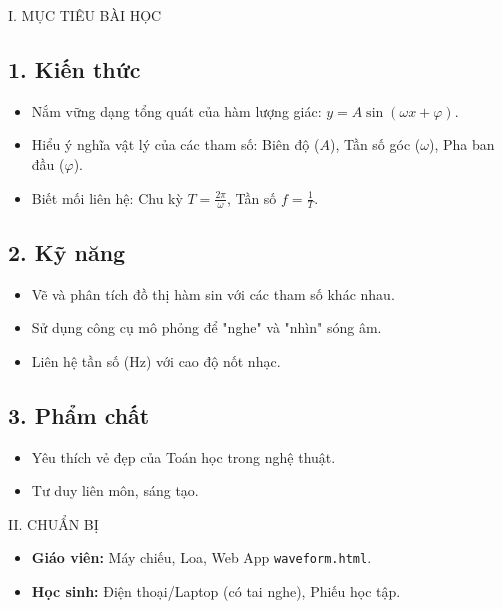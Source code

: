 \documentclass[12pt,a4paper]{article}
\begin{document}
\begin{sectionbox}{I. MỤC TIÊU BÀI HỌC}
\subsection*{1. Kiến thức}
\begin{itemize}
    \item Nắm vững dạng tổng quát của hàm lượng giác: $y = A\sin(\omega x + \varphi)$.
    \item Hiểu ý nghĩa vật lý của các tham số: Biên độ ($A$), Tần số góc ($\omega$), Pha ban đầu ($\varphi$).
    \item Biết mối liên hệ: Chu kỳ $T = \frac{2\pi}{\omega}$, Tần số $f = \frac{1}{T}$.
\end{itemize}

\subsection*{2. Kỹ năng}
\begin{itemize}
    \item Vẽ và phân tích đồ thị hàm sin với các tham số khác nhau.
    \item Sử dụng công cụ mô phỏng để "nghe" và "nhìn" sóng âm.
    \item Liên hệ tần số (Hz) với cao độ nốt nhạc.
\end{itemize}

\subsection*{3. Phẩm chất}
\begin{itemize}
    \item Yêu thích vẻ đẹp của Toán học trong nghệ thuật.
    \item Tư duy liên môn, sáng tạo.
\end{itemize}
\end{sectionbox}

\begin{sectionbox}{II. CHUẨN BỊ}
\begin{itemize}
    \item \textbf{Giáo viên:} Máy chiếu, Loa, Web App \texttt{waveform.html}.
    \item \textbf{Học sinh:} Điện thoại/Laptop (có tai nghe), Phiếu học tập.
\end{itemize}
\end{sectionbox}
\end{document}
